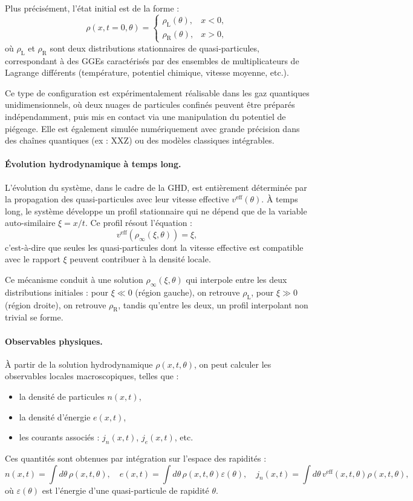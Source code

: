 Plus précisément, l’état initial est de la forme :
\[
\rho(x,t=0,\theta) =
\begin{cases}
\rho_{\mathrm{L}}(\theta), & x < 0, \\
\rho_{\mathrm{R}}(\theta), & x > 0,
\end{cases}
\]
où $\rho_{\mathrm{L}}$ et $\rho_{\mathrm{R}}$ sont deux distributions stationnaires de quasi-particules, correspondant à des GGEs caractérisés par des ensembles de multiplicateurs de Lagrange différents (température, potentiel chimique, vitesse moyenne, etc.).

Ce type de configuration est expérimentalement réalisable dans les gaz quantiques unidimensionnels, où deux nuages de particules confinés peuvent être préparés indépendamment, puis mis en contact via une manipulation du potentiel de piégeage. Elle est également simulée numériquement avec grande précision dans des chaînes quantiques (ex : XXZ) ou des modèles classiques intégrables.

\paragraph{Évolution hydrodynamique à temps long.}
L’évolution du système, dans le cadre de la GHD, est entièrement déterminée par la propagation des quasi-particules avec leur vitesse effective $v^{\mathrm{eff}}(\theta)$. À temps long, le système développe un profil stationnaire qui ne dépend que de la variable auto-similaire $\xi = x/t$. Ce profil résout l’équation :
\[
v^{\mathrm{eff}}(\rho_\infty(\xi,\theta)) = \xi,
\]
c’est-à-dire que seules les quasi-particules dont la vitesse effective est compatible avec le rapport $\xi$ peuvent contribuer à la densité locale.

Ce mécanisme conduit à une solution $\rho_\infty(\xi,\theta)$ qui interpole entre les deux distributions initiales : pour $\xi \ll 0$ (région gauche), on retrouve $\rho_{\mathrm{L}}$, pour $\xi \gg 0$ (région droite), on retrouve $\rho_{\mathrm{R}}$, tandis qu'entre les deux, un profil interpolant non trivial se forme.

\paragraph{Observables physiques.}
À partir de la solution hydrodynamique $\rho(x,t,\theta)$, on peut calculer les observables locales macroscopiques, telles que :
\begin{itemize}
    \item la densité de particules $n(x,t)$,
    \item la densité d’énergie $e(x,t)$,
    \item les courants associés : $j_n(x,t)$, $j_e(x,t)$, etc.
\end{itemize}
Ces quantités sont obtenues par intégration sur l’espace des rapidités :
\[
n(x,t) = \int d\theta\, \rho(x,t,\theta), \quad
e(x,t) = \int d\theta\, \rho(x,t,\theta) \varepsilon(\theta), \quad
j_n(x,t) = \int d\theta\, v^{\mathrm{eff}}(x,t,\theta) \rho(x,t,\theta),
\]
où $\varepsilon(\theta)$ est l’énergie d’une quasi-particule de rapidité $\theta$.

